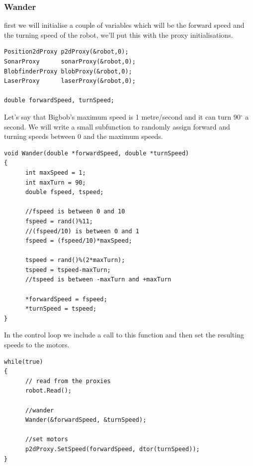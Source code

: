 \documentclass[a4paper]{report}
\begin{document}
\subsubsection{Wander}

first we will initialise a couple of variables which will be the forward speed and the turning speed of the robot, we'll put this with the proxy initialisations.
\begin{verbatim}
Position2dProxy p2dProxy(&robot,0);
SonarProxy      sonarProxy(&robot,0);
BlobfinderProxy blobProxy(&robot,0);
LaserProxy      laserProxy(&robot,0);

double forwardSpeed, turnSpeed;
\end{verbatim}

Let's say that Bigbob's maximum speed is 1 metre/second and it can turn 90$^\circ$ a second. We will write a small subfunction to randomly assign forward and turning speeds between 0 and the maximum speeds.
\begin{verbatim}
void Wander(double *forwardSpeed, double *turnSpeed)
{
      int maxSpeed = 1;
      int maxTurn = 90;
      double fspeed, tspeed;
	
      //fspeed is between 0 and 10
      fspeed = rand()%11;
      //(fspeed/10) is between 0 and 1
      fspeed = (fspeed/10)*maxSpeed;
	
      tspeed = rand()%(2*maxTurn);
      tspeed = tspeed-maxTurn;
      //tspeed is between -maxTurn and +maxTurn
	
      *forwardSpeed = fspeed;
      *turnSpeed = tspeed;
} 
\end{verbatim}
In the control loop we include a call to this function and then set the resulting speeds to the motors.
\begin{verbatim}
while(true)
{		
      // read from the proxies
      robot.Read();

      //wander
      Wander(&forwardSpeed, &turnSpeed);

      //set motors
      p2dProxy.SetSpeed(forwardSpeed, dtor(turnSpeed));
}
\end{verbatim}
\end{document}
